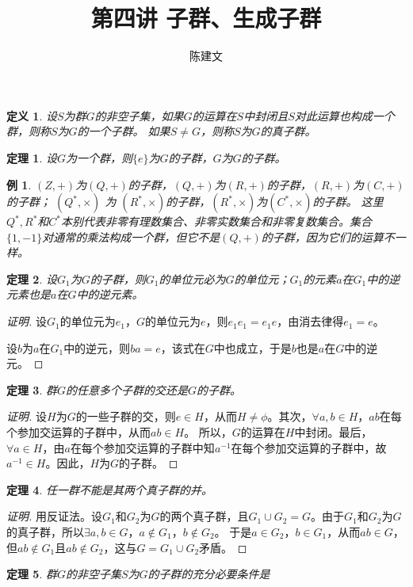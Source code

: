 \documentclass{article}
\newtheorem{Def}{定义}
\newtheorem{Thm}{定理}
\newtheorem*{Example}{例}
\begin{document}
\begin{CJK*}{UTF8}{gbsn}
  \title{第四讲 子群、生成子群}
  \author{陈建文}
  \maketitle
  \begin{Def}
    设$S$为群$G$的非空子集，如果$G$的运算在$S$中封闭且$S$对此运算也构成一个群，则称$S$为$G$的一个子群。
    如果$S\neq G$，则称$S$为$G$的真子群。
   \end{Def} 
  \begin{Thm}
  设$G$为一个群，则$\{e\}$为$G$的子群，$G$为$G$的子群。
  \end{Thm}
  \begin{Example}
    $(Z,+)$为$(Q,+)$的子群，$(Q,+)$为$(R,+)$的子群，$(R,+)$为$(C,+)$的子群；
    $(Q^*,\times)$ 为 $(R^*,\times)$的子群，$(R^*,\times)$为$(C^*,\times)$的子群。
    这里$Q^*,R^*$和$C^*$本别代表非零有理数集合、非零实数集合和非零复数集合。集合$\{1,-1\}$对通常的乘法构成一个群，但它不是$(Q,+)$的子群，因为它们的运算不一样。
  \end{Example}
  
   \begin{Thm}
    设$G_1$为$G$的子群，则$G_1$的单位元必为$G$的单位元；$G_1$的元素$a$在$G_1$中的逆元素也是$a$在$G$中的逆元素。
   \end{Thm}
  \begin{proof}[证明]
    设$G_1$的单位元为$e_1$，$G$的单位元为$e$，则$e_1e_1=e_1e$，由消去律得$e_1=e$。
  
    设$b$为$a$在$G_1$中的逆元，则$ba=e$，该式在$G$中也成立，于是$b$也是$a$在$G$中的逆元。
  \end{proof}
   \begin{Thm}
    群$G$的任意多个子群的交还是$G$的子群。
   \end{Thm}
  \begin{proof}[证明]
    设$H$为$G$的一些子群的交，则$e\in H$，从而$H\neq \phi$。其次，$\forall a,b\in H$，$ab$在每个参加交运算的子群中，从而$ab\in H$。
    所以，$G$的运算在$H$中封闭。最后，$\forall a\in H$，由$a$在每个参加交运算的子群中知$a^{-1}$在每个参加交运算的子群中，故$a^{-1}\in H$。因此，$H$为$G$的子群。
  \end{proof}
   \begin{Thm}
    任一群不能是其两个真子群的并。
   \end{Thm}
  \begin{proof}[证明]
    用反证法。设$G_1$和$G_2$为$G$的两个真子群，且$G_1\cup G_2=G$。由于$G_1$和$G_2$为$G$的真子群，所以$\exists a,b\in G$，$a\notin G_1$，$b\notin G_2$。
    于是$a\in G_2$，$b\in G_1$，从而$ab\in G$，但$ab\notin G_1$且$ab\notin G_2$，这与$G=G_1\cup G_2$矛盾。
  \end{proof}
   \begin{Thm}
    群$G$的非空子集$S$为$G$的子群的充分必要条件是
  

\end{Thm}
\end{CJK*}
\end{document}
